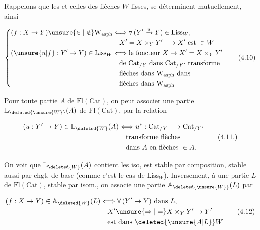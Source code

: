 
Rappelons que les    et celles  des flèches $W$-lisses, se déterminent mutuellement, ainsi

\[
\left\{\begin{aligned}
(f:X\to Y)\unsure{\in|\notin}\mathrm W_{\mathrm{asph}}&\Longleftrightarrow
  \forall\,(Y'\xrightarrow{u}Y)\in\mathrm{Liss}_{W},\\
  &\quad X'=X\times_Y Y'\longrightarrow X'\ \text{est}\ \in W\\
(\unsure{u|f}:Y'\to Y)\in\mathrm{Liss}_{W}&\Longleftrightarrow
  \text{le foncteur }X\mapsto X'=X\times_Y Y'\\
 &\quad\text{de }\mathrm{Cat}_{/Y}\text{ dans }\mathrm{Cat}_{/Y'}\ \text{transforme}\\
 &\quad\text{flèches dans }\mathrm W_{\mathrm{asph}}\text{ dans}\\
 &\quad\text{flèches dans }\mathrm W_{\mathrm{asph}}
\end{aligned}\right.
\tag*{(4.10)}
\]

Pour toute partie $A$ de $\mathrm{Fl}(\mathrm{Cat})$,  on peut associer une partie $\mathbb{L}_{\deleted{\unsure{W}}}(A)$ de $\mathrm{Fl}(\mathrm{Cat})$, par la relation

\[
\begin{aligned}
(u:Y'\to Y)\in\mathbb{L}_{\deleted{W}}(A)&\Longleftrightarrow u^*:\mathrm{Cat}_{/Y}\longrightarrow\mathrm{Cat}_{/Y'}\\
&\quad\text{transforme flèches}\\
&\quad\text{dans }A\text{ en flèches }\in A.
\end{aligned}
\tag*{(4.11.)}
\]

On voit que $\mathbb{L}_{\deleted{W}}(A)$ contient les iso, est stable par composition,    stable aussi par chgt. de base (comme c'est le cas de $\mathrm{Liss}_{W}$).  Inversement, à une partie $L$ de $\mathrm{Fl}(\mathrm{Cat})$, stable par isom., on associe une partie $\mathbb A_{\deleted{\unsure{W}}}(L)$ par

\[
\begin{aligned}
(f:X\to Y)\in\mathbb A_{\deleted{W}}(L)&\Longleftrightarrow\forall\,(Y'\to Y)\text{ dans }L,\\
&\quad X'\unsure{\Rightarrow|=}X\times_Y Y'\to Y'\\
&\quad\text{est dans }\deleted{\unsure{A|L}}W
\end{aligned}
\tag*{(4.12)}
\]

